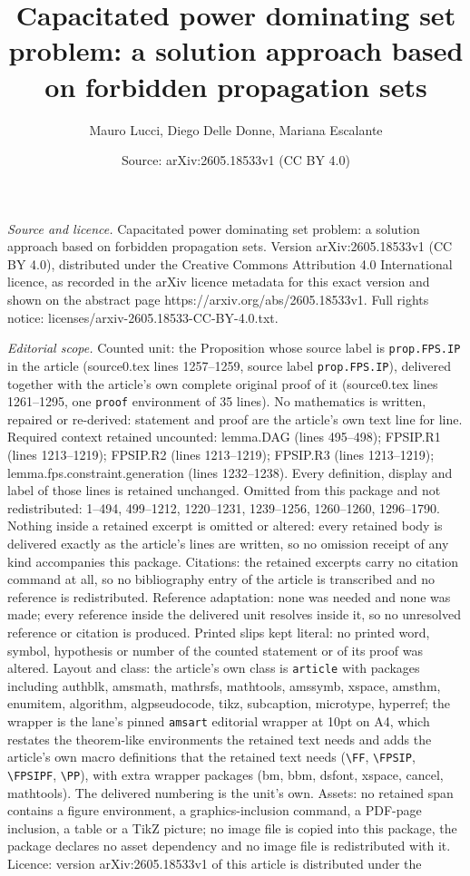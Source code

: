 \documentclass[10pt,a4paper]{amsart}
\title[Capacitated power dominating set problem: a solution approac]{Capacitated power dominating set problem: a solution approach based on forbidden propagation sets}
\author{Mauro Lucci, Diego Delle Donne, Mariana Escalante}
\date{Source: arXiv:2605.18533v1 (CC BY 4.0)}
\begin{document}
\maketitle

\noindent\emph{Source and licence.} Capacitated power dominating set problem: a solution approach based on forbidden propagation sets. Version arXiv:2605.18533v1 (CC BY 4.0), distributed under the Creative Commons Attribution 4.0 International licence, as recorded in the arXiv licence metadata for this exact version and shown on the abstract page https://arxiv.org/abs/2605.18533v1. Full rights notice: licenses/arxiv-2605.18533-CC-BY-4.0.txt.\par\smallskip

\noindent\textit{Editorial scope.} Counted unit: the Proposition whose source label is \texttt{prop.FPS.IP} in the article (source0.tex lines 1257--1259, source label \texttt{prop.FPS.IP}), delivered together with the article's own complete original proof of it (source0.tex lines 1261--1295, one \texttt{proof} environment of 35 lines). No mathematics is written, repaired or re-derived: statement and proof are the article's own text line for line. Required context retained uncounted: lemma.DAG (lines 495--498); FPSIP.R1 (lines 1213--1219); FPSIP.R2 (lines 1213--1219); FPSIP.R3 (lines 1213--1219); lemma.fps.constraint.generation (lines 1232--1238). Every definition, display and label of those lines is retained unchanged. Omitted from this package and not redistributed: 1--494, 499--1212, 1220--1231, 1239--1256, 1260--1260, 1296--1790. Nothing inside a retained excerpt is omitted or altered: every retained body is delivered exactly as the article's lines are written, so no omission receipt of any kind accompanies this package. Citations: the retained excerpts carry no citation command at all, so no bibliography entry of the article is transcribed and no reference is redistributed. Reference adaptation: none was needed and none was made; every reference inside the delivered unit resolves inside it, so no unresolved reference or citation is produced. Printed slips kept literal: no printed word, symbol, hypothesis or number of the counted statement or of its proof was altered. Layout and class: the article's own class is \texttt{article} with packages including authblk, amsmath, mathrsfs, mathtools, amssymb, xspace, amsthm, enumitem, algorithm, algpseudocode, tikz, subcaption, microtype, hyperref; the wrapper is the lane's pinned \texttt{amsart} editorial wrapper at 10pt on A4, which restates the theorem-like environments the retained text needs and adds the article's own macro definitions that the retained text needs (\texttt{\textbackslash FF}, \texttt{\textbackslash FPSIP}, \texttt{\textbackslash FPSIPF}, \texttt{\textbackslash PP}), with extra wrapper packages (bm, bbm, dsfont, xspace, cancel, mathtools). The delivered numbering is the unit's own. Assets: no retained span contains a figure environment, a graphics-inclusion command, a PDF-page inclusion, a table or a TikZ picture; no image file is copied into this package, the package declares no asset dependency and no image file is redistributed with it. Licence: version arXiv:2605.18533v1 of this article is distributed under the 
\end{document}
